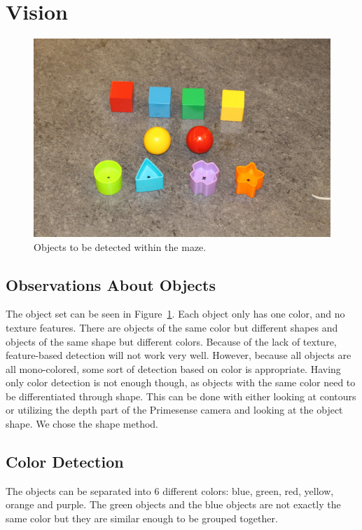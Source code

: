\section{Vision}
\begin{figure}
  \centering
  \includegraphics[width=\linewidth]{images/objects.jpg}
  \caption{Objects to be detected within the maze.}
  \label{fig:shapes}
\end{figure}
\subsection{Observations About Objects}
The object set can be seen in Figure~\ref{fig:shapes}. Each object only has one
color, and no texture features. There are objects of the same color but
different shapes and objects of the same shape but different colors. Because of
the lack of texture, feature-based detection\cite{feature} will not work very
well. However, because all objects are all mono-colored, some sort of detection
based on color is appropriate. Having only color detection is not enough though,
as objects with the same color need to be differentiated through shape. This can
be done with either looking at contours or utilizing the depth part of the
Primesense camera and looking at the object shape. We chose the shape method.

\subsection{Color Detection}
The objects can be separated into 6 different colors: blue, green, red, yellow,
orange and purple. The green objects and the blue objects are not exactly the
same color but they are similar enough to be grouped together.

